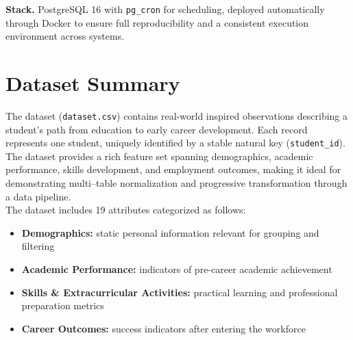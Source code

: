 \documentclass[11pt]{article}
\begin{document}
\textbf{Stack.} PostgreSQL 16 with \texttt{pg\_cron} for scheduling, deployed automatically through Docker to ensure full reproducibility and a consistent execution environment across systems.


\section{Dataset Summary}
The dataset (\texttt{dataset.csv}) contains real-world inspired observations describing a student's path from education to early career development. Each record represents one student, uniquely identified by a stable natural key (\texttt{student\_id}). The dataset provides a rich feature set spanning demographics, academic performance, skills development, and employment outcomes, making it ideal for demonstrating multi–table normalization and progressive transformation through a data pipeline.\\[6pt]

The dataset includes 19 attributes categorized as follows:

\begin{itemize}
\item \textbf{Demographics:} static personal information relevant for grouping and filtering\\[-6pt]
\item \textbf{Academic Performance:} indicators of pre-career academic achievement\\[-6pt]
\item \textbf{Skills \& Extracurricular Activities:} practical learning and professional preparation metrics\\[-6pt]
\item \textbf{Career Outcomes:} success indicators after entering the workforce
\end{itemize}
\end{document}
